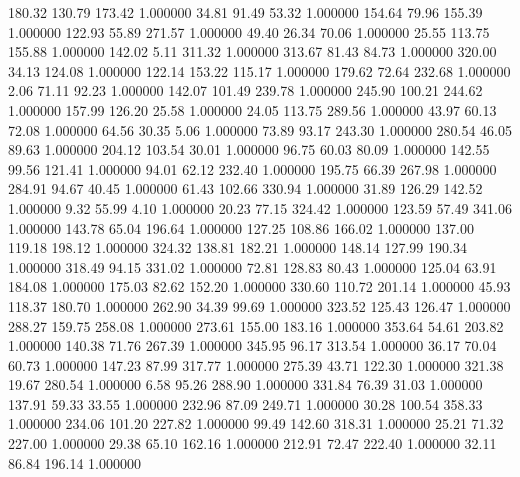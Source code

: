     180.32    130.79    173.42  1.000000
     34.81     91.49     53.32  1.000000
    154.64     79.96    155.39  1.000000
    122.93     55.89    271.57  1.000000
     49.40     26.34     70.06  1.000000
     25.55    113.75    155.88  1.000000
    142.02      5.11    311.32  1.000000
    313.67     81.43     84.73  1.000000
    320.00     34.13    124.08  1.000000
    122.14    153.22    115.17  1.000000
    179.62     72.64    232.68  1.000000
      2.06     71.11     92.23  1.000000
    142.07    101.49    239.78  1.000000
    245.90    100.21    244.62  1.000000
    157.99    126.20     25.58  1.000000
     24.05    113.75    289.56  1.000000
     43.97     60.13     72.08  1.000000
     64.56     30.35      5.06  1.000000
     73.89     93.17    243.30  1.000000
    280.54     46.05     89.63  1.000000
    204.12    103.54     30.01  1.000000
     96.75     60.03     80.09  1.000000
    142.55     99.56    121.41  1.000000
     94.01     62.12    232.40  1.000000
    195.75     66.39    267.98  1.000000
    284.91     94.67     40.45  1.000000
     61.43    102.66    330.94  1.000000
     31.89    126.29    142.52  1.000000
      9.32     55.99      4.10  1.000000
     20.23     77.15    324.42  1.000000
    123.59     57.49    341.06  1.000000
    143.78     65.04    196.64  1.000000
    127.25    108.86    166.02  1.000000
    137.00    119.18    198.12  1.000000
    324.32    138.81    182.21  1.000000
    148.14    127.99    190.34  1.000000
    318.49     94.15    331.02  1.000000
     72.81    128.83     80.43  1.000000
    125.04     63.91    184.08  1.000000
    175.03     82.62    152.20  1.000000
    330.60    110.72    201.14  1.000000
     45.93    118.37    180.70  1.000000
    262.90     34.39     99.69  1.000000
    323.52    125.43    126.47  1.000000
    288.27    159.75    258.08  1.000000
    273.61    155.00    183.16  1.000000
    353.64     54.61    203.82  1.000000
    140.38     71.76    267.39  1.000000
    345.95     96.17    313.54  1.000000
     36.17     70.04     60.73  1.000000
    147.23     87.99    317.77  1.000000
    275.39     43.71    122.30  1.000000
    321.38     19.67    280.54  1.000000
      6.58     95.26    288.90  1.000000
    331.84     76.39     31.03  1.000000
    137.91     59.33     33.55  1.000000
    232.96     87.09    249.71  1.000000
     30.28    100.54    358.33  1.000000
    234.06    101.20    227.82  1.000000
     99.49    142.60    318.31  1.000000
     25.21     71.32    227.00  1.000000
     29.38     65.10    162.16  1.000000
    212.91     72.47    222.40  1.000000
     32.11     86.84    196.14  1.000000
